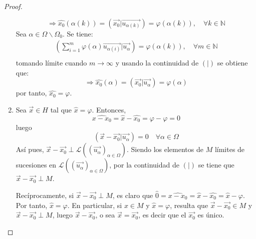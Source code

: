 \documentclass[12pt]{report}
\theoremstyle{largebreak}
\newcommand\pint[2]{\ensuremath{\left(#1\big| #2\right)}}
\begin{document}
\begin{proof}
\begin{enumerate}
\begin{equation*}
                \Rightarrow \hat{x_0}(\alpha(k))=\pint{\vec{x_0}}{\vec{u_{\alpha(k)}}}=\varphi(\alpha(k)),\quad\forall k\in\mathbb{N}
            \end{equation*}
            Sea $\alpha\in\Omega\backslash\Omega_0$. Se tiene:
            \begin{equation*}
                \begin{split}
                    \pint{\sum_{i=1 }^{m}\varphi(\alpha)\vec{u_{\alpha(i)}}}{\vec{u_{\alpha}}}=\varphi(\alpha(k)),\quad\forall m\in\mathbb{N} \\
                \end{split}
            \end{equation*}
            tomando límite cuando $m\rightarrow\infty$ y usando la continuidad de $\pint{}{}$ se obtiene que:
            \begin{equation*}
                \Rightarrow \hat{x_0}(\alpha)=\pint{\vec{x_0}}{\vec{u_{\alpha}}}=\varphi(\alpha)
            \end{equation*}
            por tanto, $\hat{x_0}=\varphi$.

            \item Sea $\vec{x}\in H$ tal que $\hat{x}=\varphi$. Entonces,
            \begin{equation*}
                \widehat{x-x_0}=\hat{x}-\hat{x_0}=\varphi-\varphi=0
            \end{equation*}
            luego
            \begin{equation*}
                \pint{\vec{x}-\vec{x_0}}{\vec{u_\alpha}}=0\quad\forall\alpha\in\Omega
            \end{equation*}
            Así pues, $\vec{x}-\vec{x_0}\perp\mathcal{L}((\vec{u_\alpha})_{\alpha\in\Omega})$. Siendo los elementos de $M$ límites de sucesiones en $\mathcal{L}((\vec{u_\alpha})_{\alpha\in\Omega})$, por la continuidad de $\pint{}{}$ se tiene que $\vec{x}-\vec{x_0}\perp M$.

            Recíprocamente, si $\vec{x}-\vec{x_0}\perp M$, es claro que $\hat{0}=\widehat{x-x_0}=\hat{x}-\hat{x_0}=\hat{x}-\varphi$. Por tanto, $\hat{x}=\varphi$. En particular, si $x\in M$ y $\hat{x}=\varphi$, resulta que $\vec{x}-\vec{x_0}\in M$ y $\vec{x}-\vec{x_0}\perp M$, luego $\vec{x}-\vec{x_0}$, o sea $\vec{x}=\vec{x_0}$, es decir que el $\vec{x_0}$ es único.
        \end{enumerate}
    \end{proof}
\end{document}
